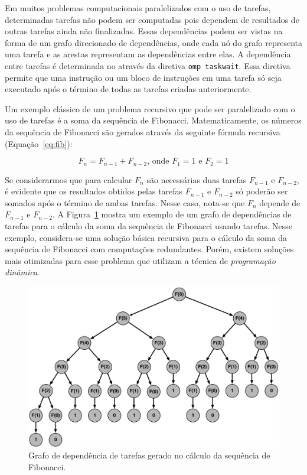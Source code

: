 \documentclass{SBCbookchapter}
\begin{document}
	Em muitos problemas computacionais paralelizados com o uso de
	tarefas, determinadas tarefas não podem ser computadas pois dependem
	de resultados de outras tarefas ainda não finalizadas. Essas
	dependências podem ser vistas na forma de um grafo direcionado de
	dependências, onde cada nó do grafo representa uma tarefa e as
	arestas representam as dependências entre elas. A dependência entre
	tarefas é determinada no \openmp através da diretiva \texttt{omp
	taskwait}. Essa diretiva permite que uma instrução ou um bloco de
	instruções em uma tarefa só seja executado após o término de todas
	as tarefas criadas anteriormente.
	
	Um exemplo clássico de um problema recursivo que pode ser
	paralelizado com o uso de tarefas é a soma da sequência de
	Fibonacci. Matematicamente, os números da sequência de Fibonacci são
	gerados através da seguinte fórmula recursiva (Equação~\ref{eq:fib}):
	
	\begin{equation}
		F_n = F_{n-1} + F_{n-2} \text{, onde } F_1=1 \text{ e } F_2=1
		\label{eq:fib}
	\end{equation}

	Se considerarmos que para calcular $F_n$ são necessárias duas
	tarefas $F_{n-1}$ e $F_{n-2}$, é evidente que os resultados obtidos
	pelas tarefas $F_{n-1}$ e $F_{n-2}$ só poderão ser somados após o término
	de ambas tarefas. Nesse caso, nota-se que $F_n$ depende de $F_{n-1}$ e
	$F_{n-2}$. A Figura~\ref{fig:fibonacci} mostra um exemplo de um grafo de dependências
	de tarefas para o cálculo da soma da sequência de Fibonacci usando tarefas.
	Nesse exemplo, considera-se uma solução básica recursiva para o cálculo
	da soma da sequência de Fibonacci com computações redundantes. Porém,
	existem soluções mais otimizadas para esse problema que utilizam a técnica de
	\textit{programação dinâmica}.

	\begin{figure}[t]
		\centering
		\includegraphics[width=0.7\linewidth]{img/fibonacci}
		\caption{Grafo de dependência de tarefas gerado no cálculo da sequência
		de Fibonacci.}\label{fig:fibonacci}
	\end{figure}
\end{document}
